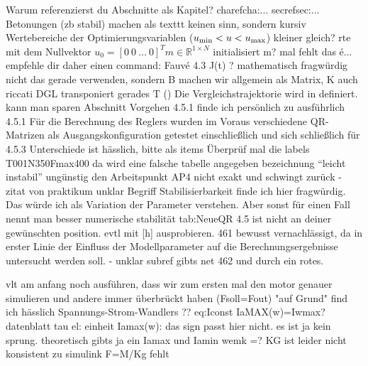 Warum referenzierst du Abschnitte als Kapitel?  charef{cha:...} secref{sec:...}
Betonungen (zb stabil) machen als texttt keinen sinn, sondern kursiv
Wertebereiche der Optimierungsvariablen (\zB $u_{\mathrm{min}}<u<u_{\mathrm{max}}$)   kleiner gleich?
rte mit dem Nullvektor $u_0 = [0 \ 0 \ \ldots \ 0 ]^Tm\in \mathbb{R}^{1 \times N}$ initialisiert     m?
mal fehlt das é... empfehle dir daher einen command: {Fauvé \cite{fauve}}
4.3 J(t) ? mathematisch fragwürdig
nicht das gerade  verwenden, sondern \vex
B machen wir allgemein als Matrix, K auch
riccati DGL %
transponiert gerades T (\transp)
Die Vergleichstrajektorie wird in  definiert.    kann man sparen
Abschnitt Vorgehen 4.5.1 finde ich persönlich zu ausführlich
4.5.1 Für die Berechnung des Reglers wurden im Voraus verschiedene QR-Matrizen als Ausgangskonfiguration getestet einschließlich und sich schließlich für 
4.5.3 Unterschiede ist hässlich, bitte als items
Überprüf mal die labels T001N350Fmax400 da wird eine falsche tabelle angegeben
bezeichnung "`leicht instabil"' ungünstig
 den Arbeitspunkt AP4 nicht exakt und schwingt zurück -  zitat von praktikum unklar
Begriff  Stabilisierbarkeit finde ich hier fragwürdig. Das würde ich als Variation der Parameter verstehen. Aber sonst für einen Fall nennt man besser numerische stabilität
tab:NeueQR 4.5 ist nicht an deiner gewünschten position. evtl mit [h] ausprobieren. 
461 bewusst vernachlässigt, da in erster Linie der Einfluss der Modellparameter auf die Berechnungsergebnisse untersucht werden soll. - unklar
subref gibts net
462 und durch ein rotes.



vlt am anfang noch ausführen, dass wir zum ersten mal den motor genauer simulieren und andere immer überbrückt haben (Fsoll=Fout)
"auf Grund" find ich hässlich
Spannungs-Strom-Wandlers ??
eq:Iconst  IaMAX(w)=Iwmax?
datenblatt
tau el: einheit
Iamax(w): das sign passt hier nicht. es ist ja kein sprung. theoretisch gibts ja ein Iamax und Iamin
wemk =?
KG ist leider nicht konsistent zu simulink
F=M/Kg fehlt